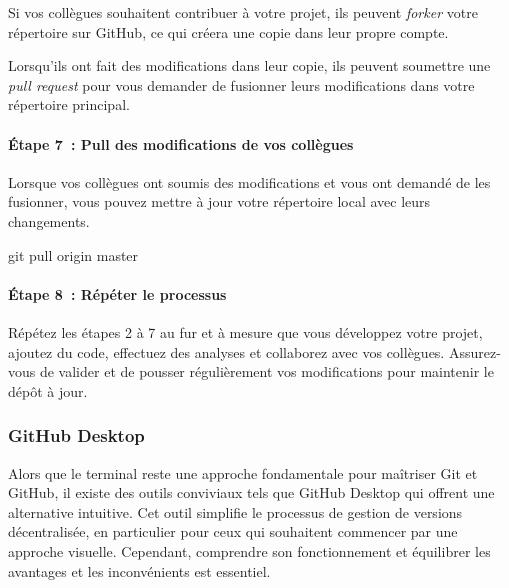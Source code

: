 \documentclass[
  letterpaper,
]{scrbook}
\let\oldparagraph\paragraph
\renewcommand{\paragraph}[1]{\oldparagraph{#1}\mbox{}}
\newenvironment{Shaded}{\begin{snugshade}}{\end{snugshade}}
\newcommand{\FunctionTok}[1]{\textcolor[rgb]{0.28,0.35,0.67}{#1}}
\newcommand{\NormalTok}[1]{\textcolor[rgb]{0.00,0.23,0.31}{#1}}
\begin{document}
Si vos collègues souhaitent contribuer à votre projet, ils peuvent
\emph{forker} votre répertoire sur GitHub, ce qui créera une copie dans
leur propre compte.

Lorsqu'ils ont fait des modifications dans leur copie, ils peuvent
soumettre une \emph{pull request} pour vous demander de fusionner leurs
modifications dans votre répertoire principal.

\hypertarget{uxe9tape-7-pull-des-modifications-de-vos-colluxe8gues}{%
\paragraph{Étape 7~: Pull des modifications de vos
collègues}\label{uxe9tape-7-pull-des-modifications-de-vos-colluxe8gues}}

Lorsque vos collègues ont soumis des modifications et vous ont demandé
de les fusionner, vous pouvez mettre à jour votre répertoire local avec
leurs changements.

\begin{Shaded}
\begin{Highlighting}[]
\FunctionTok{git}\NormalTok{ pull origin master}
\end{Highlighting}
\end{Shaded}

\hypertarget{uxe9tape-8-ruxe9puxe9ter-le-processus}{%
\paragraph{Étape 8~: Répéter le
processus}\label{uxe9tape-8-ruxe9puxe9ter-le-processus}}

Répétez les étapes 2 à 7 au fur et à mesure que vous développez votre
projet, ajoutez du code, effectuez des analyses et collaborez avec vos
collègues. Assurez-vous de valider et de pousser régulièrement vos
modifications pour maintenir le dépôt à jour.

\hypertarget{github-desktop}{%
\subsubsection{GitHub Desktop}\label{github-desktop}}

Alors que le terminal reste une approche fondamentale pour maîtriser Git
et GitHub, il existe des outils conviviaux tels que GitHub Desktop qui
offrent une alternative intuitive. Cet outil simplifie le processus de
gestion de versions décentralisée, en particulier pour ceux qui
souhaitent commencer par une approche visuelle. Cependant, comprendre
son fonctionnement et équilibrer les avantages et les inconvénients est
essentiel.
\end{document}
